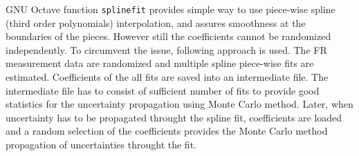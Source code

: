 \documentclass[a4paper, 12pt]{article}
\begin{document}
GNU Octave function \texttt{splinefit} provides simple way to use piece-wise spline (third
order polynomials) interpolation, and assures smoothness at
the boundaries of the pieces. However still the coefficients cannot be
randomized independently. To circumvent the issue, following approach is used.
The FR measurement data are randomized and multiple spline piece-wise fits are
estimated. Coefficients of the all fits are saved into an intermediate file. The
intermediate file has to consist of sufficient number of fits to provide good
statistics for the uncertainty propagation using Monte Carlo method. Later, when
uncertainty has to be propagated throught the spline fit, coefficients are
loaded and a random selection of the coefficients provides the Monte Carlo
method propagation of uncertainties throught the fit.
\end{document}
